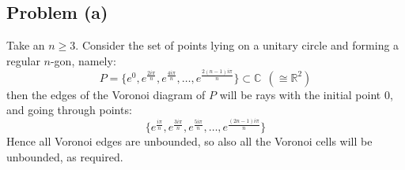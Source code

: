 \subsection*{Problem (a)}
Take an \(n\geq 3\). Consider the set of points lying on a unitary circle and forming a regular \(n\)-gon, namely:
\[P = \{e^0, e^{\frac{2 i \pi}{n}} , e^{\frac{ 4 i \pi}{n}},\dots , e^{\frac{ 2(n-1) i \pi}{n}}\} \subset \mathbb C\ \  (\cong \mathbb R^2)\]
then the edges of the Voronoi diagram of \(P\) will be rays with the initial point 0, and going through points:
\[  \{e^{\frac{ i \pi}{n}}, e^{\frac{3 i \pi}{n}} , e^{\frac{ 5 i \pi}{n}},\dots , e^{\frac{ (2n-1) i \pi}{n}}\}\]
Hence all Voronoi edges are unbounded, so also all the Voronoi cells will be unbounded, as required.